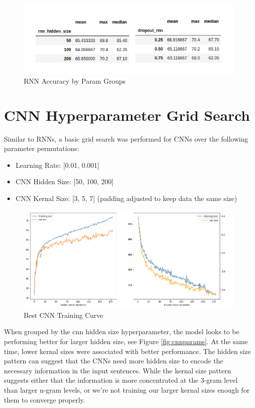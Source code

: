 \documentclass[a4paper,10pt]{article}
\begin{document}
\begin{figure}[h]
    \centering
    \includegraphics[scale=0.7]{rnn_params}
    \caption{RNN Accuracy by Param Groups}
    \label{fig:rnnparams}
\end{figure}


\section{CNN Hyperparameter Grid Search}
Similar to RNNs, a basic grid search was performed for CNNs over the following parameter permutations: 
\begin{itemize}
\item Learning Rate: [0.01, 0.001]
\item CNN Hidden Size: [50, 100, 200]
\item CNN Kernal Size: [3, 5, 7] (padding adjusted to keep data the same size)
\end{itemize}

\begin{figure}[h]
    \centering
    \includegraphics[scale=0.4]{cnn_best}
    \caption{Best CNN Training Curve}
    \label{fig:cnnbest}
\end{figure}


\par 
\justify
When grouped by the cnn hidden size hyperparameter, the model looks to be performing better for larger hidden size, see Figure \ref{fig:cnnparams}. At the same time, lower kernal sizes were associated with better performance. The hidden size pattern can suggest that the CNNs need more hidden size to encode the necessary information in the input sentences. While the kernal size pattern suggests either that the information is more concentrated at the 3-gram level than larger n-gram levels, or we're not training our larger kernal sizes enough for them to converge properly.
\end{document}
